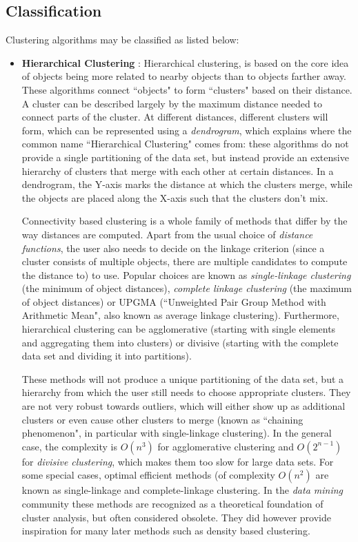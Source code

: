 \subsection{Classification}
Clustering algorithms may be classified as listed below:
\begin{itemize}
\item \textbf{Hierarchical Clustering} : Hierarchical clustering, is based on the core idea of objects being more
related to nearby objects than to objects farther away. These algorithms connect ``objects" to form ``clusters"
based on their distance. A cluster can be described largely by the maximum distance needed to connect parts of
the cluster. At different distances, different clusters will form, which can be represented using a \textit{dendrogram},
which explains where the common name ``Hierarchical Clustering" comes from: these algorithms do not provide a
single partitioning of the data set, but instead provide an extensive hierarchy of clusters that merge with each
other at certain distances. In a dendrogram, the Y-axis marks the distance at which the clusters merge, while the
objects are placed along the X-axis such that the clusters don't mix.

Connectivity based clustering is a whole family of methods that differ by the way distances are computed.
Apart from the usual choice of \textit{distance functions}, the user also needs to decide on the linkage criterion
(since a cluster consists of multiple objects, there are multiple candidates to compute the distance to) to use.
Popular choices are known as \textit{single-linkage clustering} (the minimum of object distances),
\textit{complete linkage clustering} (the maximum of object distances) or UPGMA (``Unweighted Pair Group Method with
Arithmetic Mean", also known as average linkage clustering). Furthermore, hierarchical clustering can be
agglomerative (starting with single elements and aggregating them into clusters) or divisive
(starting with the complete data set and dividing it into partitions).

These methods will not produce a unique partitioning of the data set, but a hierarchy from which the user still
needs to choose appropriate clusters. They are not very robust towards outliers, which will either show up as
additional clusters or even cause other clusters to merge (known as ``chaining phenomenon", in particular with
single-linkage clustering). In the general case, the complexity is $O(n^{3})$ for agglomerative clustering and
$O(2^{n-1})$ for \textit{divisive clustering}, which makes them too slow for large data sets. For some special cases,
optimal efficient methods (of complexity $O(n^{2})$ are known as single-linkage and complete-linkage clustering.
In the \textit{data mining} community these methods are recognized as a theoretical foundation of cluster analysis,
but often considered obsolete. They did however provide inspiration for many later methods such as density based
clustering.



\end{itemize}
